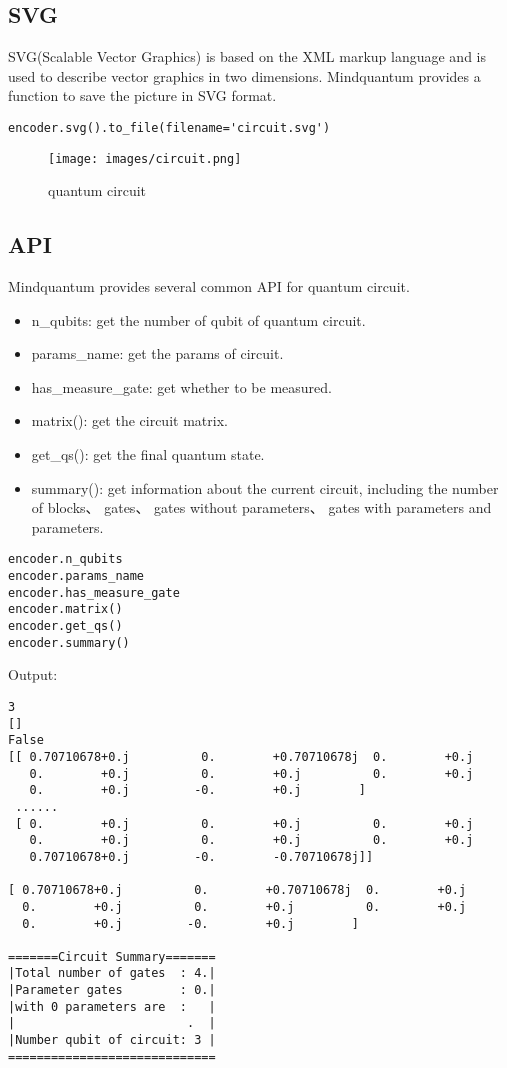\subsection{SVG}
SVG(Scalable Vector Graphics) is based on the XML markup language and is used to describe vector graphics in two dimensions. Mindquantum provides a function to save the picture in SVG format.
\begin{lstlisting}
encoder.svg().to_file(filename='circuit.svg')
\end{lstlisting}
    \begin{figure}[h]
       \begin{center}
            \texttt{[image: images/circuit.png]}
        \end{center}
        \caption{quantum circuit}
    \end{figure}
\subsection{API}
Mindquantum provides several common API for quantum circuit.
\begin{itemize}
    \item n\_qubits: get the number of qubit of quantum circuit.
    \item params\_name: get the params of circuit.
    \item has\_measure\_gate: get whether to be measured.
    \item matrix(): get the circuit matrix.
    \item get\_qs(): get the final quantum state.
    \item summary(): get information about the current circuit, including the number of blocks、 gates、 gates without parameters、 gates with parameters and parameters.
\end{itemize}
\begin{lstlisting}
encoder.n_qubits
encoder.params_name
encoder.has_measure_gate
encoder.matrix() 
encoder.get_qs()
encoder.summary()
\end{lstlisting}
Output:
\begin{lstlisting}
3
[]
False
[[ 0.70710678+0.j          0.        +0.70710678j  0.        +0.j
   0.        +0.j          0.        +0.j          0.        +0.j
   0.        +0.j         -0.        +0.j        ]
 ......
 [ 0.        +0.j          0.        +0.j          0.        +0.j
   0.        +0.j          0.        +0.j          0.        +0.j
   0.70710678+0.j         -0.        -0.70710678j]]
   
[ 0.70710678+0.j          0.        +0.70710678j  0.        +0.j
  0.        +0.j          0.        +0.j          0.        +0.j
  0.        +0.j         -0.        +0.j        ]
  
=======Circuit Summary=======
|Total number of gates  : 4.|
|Parameter gates        : 0.|
|with 0 parameters are  :   |
|                        .  |
|Number qubit of circuit: 3 |
=============================  
\end{lstlisting}
